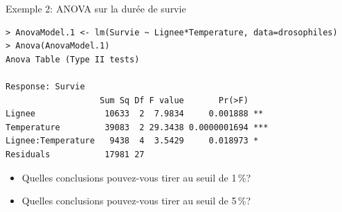 \documentclass{BeamerTemplate}
\begin{document}
\begin{frame}[fragile,t]{Exemple 2: ANOVA sur la durée de survie}

\begin{Verbatim}[fontsize=\scriptsize]
> AnovaModel.1 <- lm(Survie ~ Lignee*Temperature, data=drosophiles)
> Anova(AnovaModel.1)
Anova Table (Type II tests)

Response: Survie
                   Sum Sq Df F value       Pr(>F)
Lignee              10633  2  7.9834     0.001888 **
Temperature         39083  2 29.3438 0.0000001694 ***
Lignee:Temperature   9438  4  3.5429     0.018973 *
Residuals           17981 27
\end{Verbatim}

\medskip
\begin{itemize}\itemsep1cm
  \item Quelles conclusions pouvez-vous tirer \alert{au seuil de 1\,\%}?
  \item<2-> Quelles conclusions pouvez-vous tirer \alert{au seuil de 5\,\%}?
\end{itemize}

\end{frame}
\end{document}
